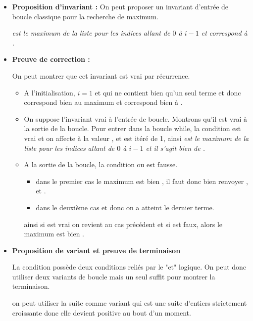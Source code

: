 \begin{itemize}
\item \textbf{Proposition d'invariant : }
On peut proposer un invariant d'entrée de boucle classique pour la recherche de maximum.

\textit{ est le maximum de la liste  pour les indices allant de $0$ à $i-1$ et correspond à .}

\item \textbf{Preuve de correction : }

On peut montrer que cet invariant est vrai par récurrence.

\begin{itemize}
\item A l'initialisation, $i=1$ et  qui ne contient bien qu'un seul terme et donc  correspond bien au maximum et correspond bien à .
\item On suppose l'invariant vrai à l'entrée de boucle. Montrons qu'il est vrai à la sortie de la boucle.
Pour entrer dans la boucle while, la condition  est vrai et on affecte à  la valeur , et  est itéré de 1, ainsi \textit{ est le maximum de la liste  pour les indices allant de $0$ à $i-1$ et il s'agit bien de .}
\item A la sortie de la boucle, la condition  ou  est fausse.
\begin{itemize}
\item dans le premier cas le maximum est bien , il faut donc bien renvoyer ,  et .
\item dans le deuxième cas  et donc on a atteint le dernier terme. 
\end{itemize}
 ainsi si  est vrai on revient au cas précédent et si  est faux, alors le maximum est bien .
\end{itemize}


\item \textbf{Proposition de variant et preuve de terminaison}

La condition  possède deux conditions reliés par le "et" logique. On peut donc utiliser deux variants de boucle mais un seul suffit pour montrer la terminaison.

on peut utiliser la suite  comme variant qui est une suite d'entiers strictement croissante donc elle devient positive au bout d'un moment.

\end{itemize}




